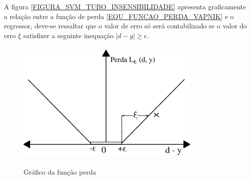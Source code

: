 A figura \ref{FIGURA_SVM_TUBO_INSENSIBILIDADE} apresenta graficamente a relação entre a função de perda \eqref{EQU_FUNCAO_PERDA_VAPNIK} e o regressor, deve-se ressaltar que o valor de erro só será contabilizado se o valor do erro \(\xi\) satisfizer a seguinte inequação \(|d - y| \geq \epsilon\).
\begin{figure}[hbt]
  \centering
  \caption{Gráfico da função perda}
  \includegraphics[width=9cm,height=6cm]{./secoes/conceitosFundamentais/pics/img/tuboRobustezComFolga.eps}
  \label{FIGURA_SVM_GRAFICO_FUNCAO_PERDA}
\end{figure}


